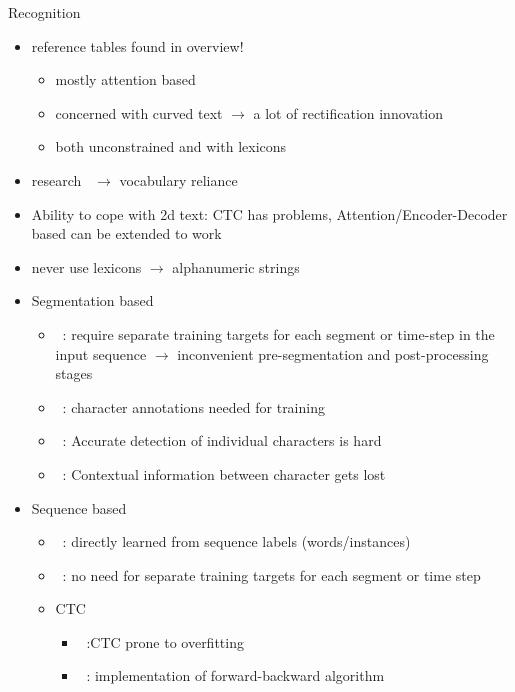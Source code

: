 Recognition
\begin{itemize}
    \item reference tables found in overview!
        \begin{itemize}
            \item mostly attention based
            \item concerned with curved text $\rightarrow$ a lot of rectification innovation
            \item both unconstrained and with lexicons
        \end{itemize}
    \item research~\cite{wan_vocabulary_2020} $\rightarrow$ vocabulary reliance
    \item Ability to cope with 2d text:
        CTC has problems,
        Attention/Encoder-Decoder based can be extended to work
    \item never use lexicons $\rightarrow$ alphanumeric strings
    \item Segmentation based
        \begin{itemize}
            \item~\cite{xie_aggregation_2019}: require separate training targets for each segment
                or time-step in the input sequence $\rightarrow$ inconvenient pre-segmentation and
                post-processing stages
            \item~\cite{shi_end--end_2017}: character annotations needed for training
            \item~\citep{chen_text_2021}: Accurate detection of individual characters is hard
            \item~\citep{chen_text_2021}: Contextual information between character gets lost
        \end{itemize}
    \item Sequence based
        \begin{itemize}
            \item~\cite{shi_end--end_2017}: directly learned from sequence labels (words/instances)
            \item~\cite{xie_aggregation_2019}: no need for separate training targets for each segment
                or time step
            \item CTC
                \begin{itemize}
                    \item~\cite{chen_text_2021}:CTC prone to overfitting
                    \item~\cite{xie_aggregation_2019}: implementation of forward-backward algorithm

\end{itemize}
\end{itemize}
\end{itemize}
